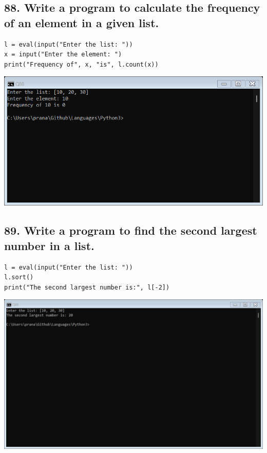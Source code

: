 \documentclass[12pt]{article}
\begin{document}
\subsection*{88. Write a program to calculate the frequency of an element in a given list.}
\begin{verbatim}
l = eval(input("Enter the list: "))
x = input("Enter the element: ")
print("Frequency of", x, "is", l.count(x))
\end{verbatim}
\includegraphics[width=\linewidth]{images/88.png}
\subsection*{89. Write a program to find the second largest number in a list.}
\begin{verbatim}
l = eval(input("Enter the list: "))
l.sort()
print("The second largest number is:", l[-2])
\end{verbatim}
\includegraphics[width=\linewidth]{images/89.png}
\end{document}
